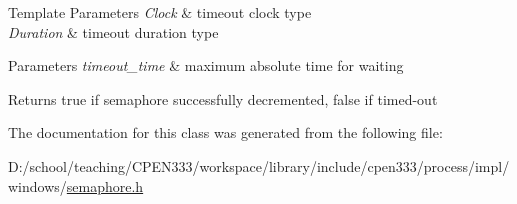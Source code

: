 \begin{DoxyTemplParams}{Template Parameters}
{\em Clock} & timeout clock type \\
\hline
{\em Duration} & timeout duration type \\
\hline
\end{DoxyTemplParams}

\begin{DoxyParams}{Parameters}
{\em timeout\+\_\+time} & maximum absolute time for waiting \\
\hline
\end{DoxyParams}
\begin{DoxyReturn}{Returns}
true if semaphore successfully decremented, false if timed-\/out 
\end{DoxyReturn}


The documentation for this class was generated from the following file\+:\begin{DoxyCompactItemize}
\item 
D\+:/school/teaching/\+C\+P\+E\+N333/workspace/library/include/cpen333/process/impl/windows/\hyperlink{process_2impl_2windows_2semaphore_8h}{semaphore.\+h}\end{DoxyCompactItemize}
